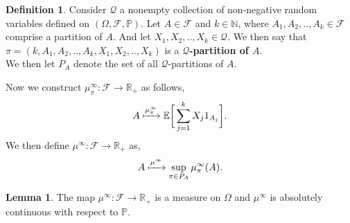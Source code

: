 \documentclass[12pt]{article}
\newcommand{\cF}{\mathcal{F}}
\newcommand{\E}{\mathbb{E}}
\newcommand{\N}{\mathbb{N}}
\newcommand{\R}{\mathbb{R}}
\newcommand{\Prb}{\mathbb{P}}
\newcommand{\PS}{(\Omega, \cF, \Prb)}
\newcommand{\vspc}{\vspace{7px}}
\theoremstyle{definition}
\newtheorem{defn}{Definition}
\newtheorem{lemma}{Lemma}
\begin{document}
\begin{defn}
    Consider $\mathcal{Q}$ a nonempty collection of non-negative random variables defined on $\PS$.
    Let $A \in \cF$ and $k \in \N$, where $A_1, A_2, .., A_k \in \cF$ comprise a partition of $A$. And let $X_1, X_2, .., X_k \in \mathcal{Q}$.
    We then say that $\pi = (k, A_1, A_2, .., A_k, X_1, X_2, .., X_k)$ is a \textbf{$\mathcal{Q}$-partition of $A$}. \\
    We then let $P_A$ denote the set of all $\mathcal{Q}$-partitions of $A$. \\
\end{defn}

Now we construct $\mu_\pi^\infty: \cF \to \R_+$ as follows,
\[
    A \xmapsto{\mu_\pi^\infty} \E \bigg [ \sum_{j=1}^k X_j 1_{A_j} \bigg ].
\]
We then define $\mu^\infty: \cF \to \R_+$ as,
\[
    A \xmapsto{\mu^\infty} \sup_{\pi \in P_A} \mu_\pi^\infty(A).
\]

\begin{lemma} \cite{karatzas1998}
    The map $\mu^\infty: \cF \to \R_+$ is a measure on $\Omega$ and $\mu^\infty$ is absolutely continuous with respect to $\Prb$.
\end{lemma}

\vspc
\end{document}
